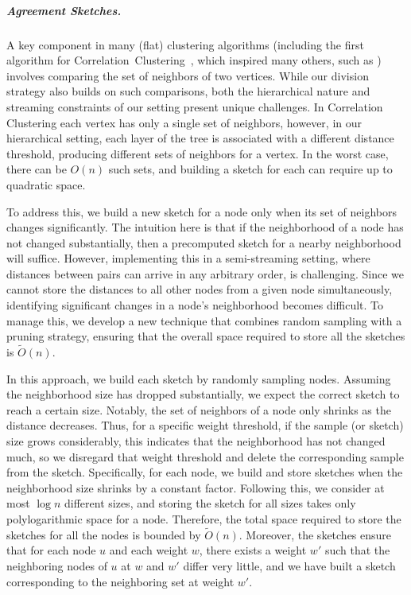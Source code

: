 \documentclass{article}
\begin{document}
\subparagraph*{Agreement Sketches.} A key component in many (flat) clustering algorithms 
(including the first algorithm for Correlation~Clustering~\cite{DBLP:conf/focs/BansalBC02}, which inspired many others, such as \cite{cohen2021correlation, Assadi022, cohen2022fitting, abs-2404-06797}) 
involves comparing the set of neighbors of two vertices. While our division strategy also builds on such comparisons, both the hierarchical nature and streaming constraints of our setting present unique challenges.
In Correlation Clustering each vertex has only a single set of neighbors, however, in our hierarchical setting, each layer of the tree is associated with a different distance threshold, producing different sets of neighbors for a vertex. In the worst case, there can be $O(n)$ such sets, and building a sketch for each can require up to quadratic space. 

To address this,
we build a new sketch for a node only when its set of neighbors changes significantly.
The intuition here is that if the neighborhood of a node has not changed substantially, then a precomputed sketch for a nearby neighborhood will suffice. However, implementing this in a semi-streaming
setting, where distances between pairs can arrive in any arbitrary order, is challenging. Since we
cannot store the distances to all other nodes from a given node simultaneously, identifying significant
changes in a node’s neighborhood becomes difficult. To manage this, we develop a new technique that combines random sampling with a pruning strategy, ensuring that the overall space required to store all the sketches is \(\tilde{O}(n)\).

In this approach, we build each sketch by randomly sampling nodes. Assuming the neighborhood size has dropped substantially, we expect the correct sketch to reach a certain size. Notably, the set of neighbors of a node only shrinks as the distance decreases. Thus, for a specific weight threshold, if the sample (or sketch) size grows considerably, this indicates that the neighborhood has not changed much, so we disregard that weight threshold and delete the corresponding sample from the sketch. Specifically, for each node, we build and store sketches when the neighborhood size shrinks by a constant factor. Following this, we consider at most \(\log n\) different sizes, and storing the sketch for all sizes takes only polylogarithmic space for a node. Therefore, the total space required to store the sketches for all the nodes is bounded by \(\tilde{O}(n)\). Moreover, the sketches ensure that for each node \(u\) and each weight \(w\), there exists a weight \(w'\) such that the neighboring nodes of \(u\) at \(w\) and \(w'\) differ very little, and we have built a sketch corresponding to the neighboring set at weight \(w'\). 
\end{document}
